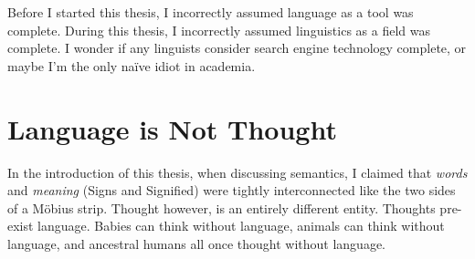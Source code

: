 
Before I started this thesis, I incorrectly assumed language as a tool was complete. During this thesis, I incorrectly assumed linguistics as a field was complete. I wonder if any linguists consider search engine technology complete, or maybe I'm the only na{\"i}ve idiot in academia.










\section{Language is Not Thought}
In the introduction of this thesis, when discussing semantics, I claimed that \textit{words} and \textit{meaning} (Signs and Signified) were tightly interconnected like the two sides of a M{\"o}bius strip. Thought however, is an entirely different entity. Thoughts pre-exist language. Babies can think without language, animals can think without language, and ancestral humans all once thought without language.

